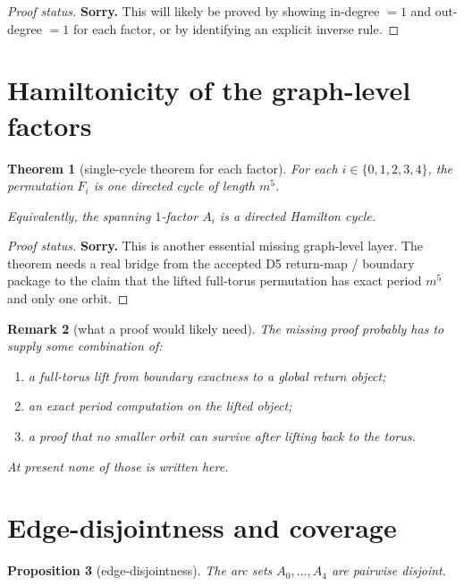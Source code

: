 \documentclass[11pt]{article}
\newtheorem{theorem}{Theorem}[section]
\newtheorem{proposition}[theorem]{Proposition}
\newtheorem{remark}[theorem]{Remark}
\begin{document}
\begin{proof}[Proof status]
\textbf{Sorry.} This will likely be proved by showing in-degree $=1$ and
out-degree $=1$ for each factor, or by identifying an explicit inverse rule.
\end{proof}

\section{Hamiltonicity of the graph-level factors}

\begin{theorem}[single-cycle theorem for each factor]
For each $i\in\{0,1,2,3,4\}$, the permutation $F_i$ is one directed cycle of
length $m^5$.

Equivalently, the spanning $1$-factor $A_i$ is a directed Hamilton cycle.
\end{theorem}

\begin{proof}[Proof status]
\textbf{Sorry.} This is another essential missing graph-level layer. The theorem
needs a real bridge from the accepted D5 return-map / boundary package to the
claim that the lifted full-torus permutation has exact period $m^5$ and only
one orbit.
\end{proof}

\begin{remark}[what a proof would likely need]
The missing proof probably has to supply some combination of:
\begin{enumerate}[label=\textup{(\arabic*)},leftmargin=2.5em]
\item a full-torus lift from boundary exactness to a global return object;
\item an exact period computation on the lifted object;
\item a proof that no smaller orbit can survive after lifting back to the
      torus.
\end{enumerate}
At present none of those is written here.
\end{remark}

\section{Edge-disjointness and coverage}

\begin{proposition}[edge-disjointness]
The arc sets $A_0,\dots,A_4$ are pairwise disjoint.
\end{proposition}
\end{document}
